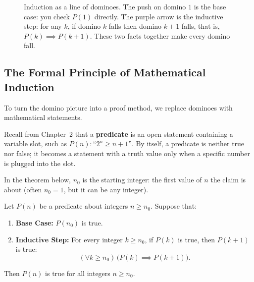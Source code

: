 \begin{figure}[htbp]
\caption{Induction as a line of dominoes. The push on domino $1$ is the base case: you check $P(1)$ directly. The purple arrow is the inductive step: for any $k$, if domino $k$ falls then domino $k+1$ falls, that is, $P(k) \implies P(k+1)$. These two facts together make every domino fall.}
\label{17:fig-domino-cascade}
\end{figure}

\subsection{The Formal Principle of Mathematical Induction}

To turn the domino picture into a proof method, we replace dominoes with mathematical statements.

Recall from Chapter~2 that a \textbf{predicate} is an open statement containing a variable slot, such as $P(n): \text{``}2^n \ge n+1\text{''}$. By itself, a predicate is neither true nor false; it becomes a statement with a truth value only when a specific number is plugged into the slot.

In the theorem below, $n_0$ is the starting integer: the first value of $n$ the claim is about (often $n_0 = 1$, but it can be any integer).

\begin{theorem}
Let $P(n)$ be a predicate about integers $n \ge n_0$. Suppose that:
\begin{enumerate}[label=(\roman*)]
\item \textbf{Base Case:} $P(n_0)$ is true.
\item \textbf{Inductive Step:} For every integer $k \ge n_0$, if $P(k)$ is true, then $P(k+1)$ is true:
\[
(\forall k \ge n_0)\,\bigl(P(k) \implies P(k+1)\bigr).
\]
\end{enumerate}
Then $P(n)$ is true for all integers $n \ge n_0$.
\end{theorem}

